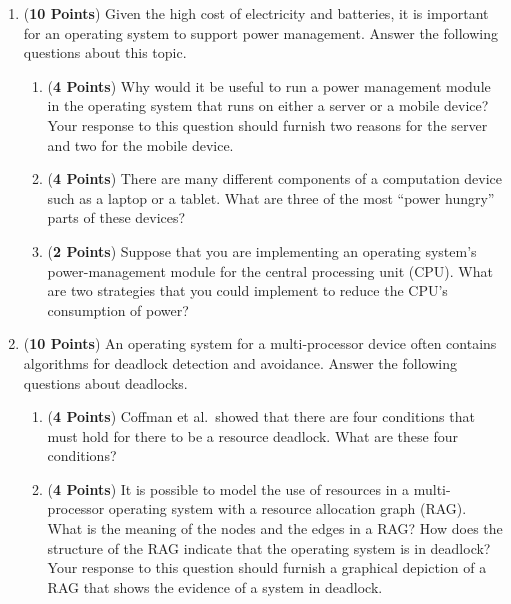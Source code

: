 \documentclass[12pt,epsf,psfig,graphics]{article}
\begin{document}
\begin{enumerate}
\begin{enumerate}
  \end{enumerate}

  \newpage

\item ({\bf 10 Points}) Given the high cost of electricity and batteries, it is important for an operating system to
  support power management.  Answer the following questions about this topic.

  \begin{enumerate}

    \item ({\bf 4 Points}) Why would it be useful to run a power management module in the operating system that runs on
      either a server or a mobile device? Your response to this question should furnish two reasons for the server and
      two for the mobile device.

    \item ({\bf 4 Points}) There are many different components of a computation device such as a laptop or a
      tablet.  What are three of the most ``power hungry'' parts of these devices? 

    \item ({\bf 2 Points}) Suppose that you are implementing an operating system's power-management module for the
      central processing unit (CPU).  What are two strategies that you could implement to reduce the CPU's consumption
      of power?

  \end{enumerate}

  \newpage

\item ({\bf 10 Points}) An operating system for a multi-processor device often contains algorithms for deadlock
  detection and avoidance.  Answer the following questions about deadlocks.

  \begin{enumerate}

    \item ({\bf 4 Points}) Coffman et al.\ showed that there are four conditions that must hold for there to be a
      resource deadlock. What are these four conditions?

    \item ({\bf 4 Points}) It is possible to model the use of resources in a multi-processor operating system with a
      resource allocation graph (RAG).  What is the meaning of the nodes and the edges in a RAG?  How does the structure
      of the RAG indicate that the operating system is in deadlock? Your response to this question should furnish a
      graphical depiction of a RAG that shows the evidence of a system in deadlock.


\end{enumerate}
\end{enumerate}
\end{document}
